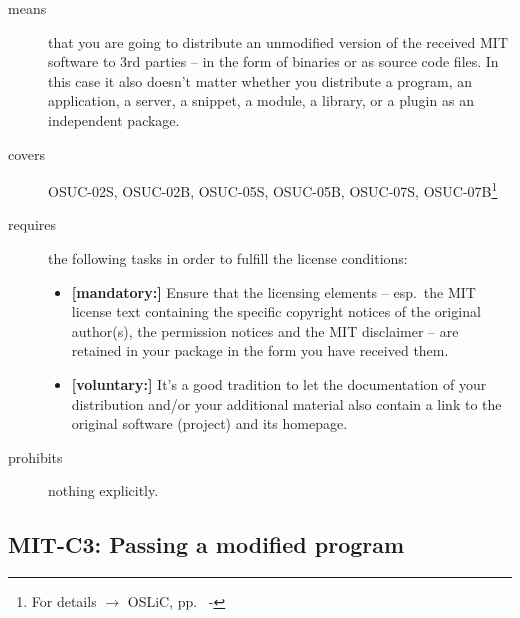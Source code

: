 \begin{description}
\item[means] that you are going to distribute an unmodified version of the
received MIT software to 3rd parties -- in the form of binaries or as source
code files. In this case it also doesn't matter whether you distribute a
program, an application, a server, a snippet, a module, a library, or a plugin
as an independent package.

\item[covers] OSUC-02S,  OSUC-02B, OSUC-05S, OSUC-05B, OSUC-07S,
OSUC-07B\footnote{For details $\rightarrow$ OSLiC, pp.\
\pageref{OSUC-02S-DEF} - \pageref{OSUC-07B-DEF}}

\item[requires] the following tasks in order to fulfill the license conditions:
\begin{itemize}
  \item \textbf{[mandatory:]} Ensure that the licensing elements -- esp.\
  the MIT license text containing the specific copyright notices of the original
  author(s), the permission notices and the MIT disclaimer -- are retained in
  your package in the form you have received them.
  \item \textbf{[voluntary:]} It's a good tradition to let the documentation of
  your distribution and/or your additional material also contain a link to the
  original software (project) and its homepage.
\end{itemize}
\item[prohibits] nothing explicitly.
\end{description}

\subsection{MIT-C3: Passing a modified program}
\label{OSUC-04S-MIT} \label{OSUC-04B-MIT}

